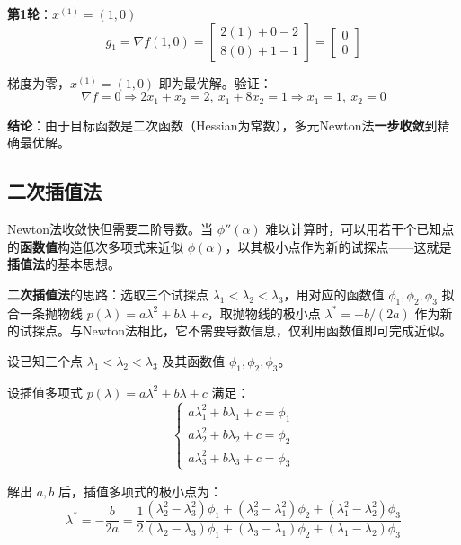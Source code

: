 \begin{example}[多元Newton法]
\textbf{第1轮}：$x^{(1)} = (1, 0)$
\[
g_1 = \nabla f(1, 0) = \begin{bmatrix} 2(1) + 0 - 2 \\ 8(0) + 1 - 1 \end{bmatrix} = \begin{bmatrix} 0 \\ 0 \end{bmatrix}
\]

梯度为零，$x^{(1)} = (1, 0)$ 即为最优解。验证：
\[
\nabla f = 0 \Rightarrow 2x_1 + x_2 = 2,\ x_1 + 8x_2 = 1 \Rightarrow x_1 = 1,\ x_2 = 0
\]

\textbf{结论}：由于目标函数是二次函数（Hessian为常数），多元Newton法\textbf{一步收敛}到精确最优解。
\end{example}

\subsection{二次插值法}

Newton法收敛快但需要二阶导数。当 $\phi''(\alpha)$ 难以计算时，可以用若干个已知点的\textbf{函数值}构造低次多项式来近似 $\phi(\alpha)$，以其极小点作为新的试探点——这就是\textbf{插值法}的基本思想。

\textbf{二次插值法}的思路：选取三个试探点 $\lambda_1 < \lambda_2 < \lambda_3$，用对应的函数值 $\phi_1, \phi_2, \phi_3$ 拟合一条抛物线 $p(\lambda) = a\lambda^2 + b\lambda + c$，取抛物线的极小点 $\lambda^* = -b/(2a)$ 作为新的试探点。与Newton法相比，它不需要导数信息，仅利用函数值即可完成近似。

\begin{conceptbox}[二次插值法原理]
设已知三个点 $\lambda_1 < \lambda_2 < \lambda_3$ 及其函数值 $\phi_1, \phi_2, \phi_3$。

设插值多项式 $p(\lambda) = a\lambda^2 + b\lambda + c$ 满足：
\[
\begin{cases}
a\lambda_1^2 + b\lambda_1 + c = \phi_1 \\
a\lambda_2^2 + b\lambda_2 + c = \phi_2 \\
a\lambda_3^2 + b\lambda_3 + c = \phi_3
\end{cases}
\]

解出 $a, b$ 后，插值多项式的极小点为：
\[
\lambda^* = -\frac{b}{2a} = \frac{1}{2} \frac{(\lambda_2^2 - \lambda_3^2)\phi_1 + (\lambda_3^2 - \lambda_1^2)\phi_2 + (\lambda_1^2 - \lambda_2^2)\phi_3}{(\lambda_2 - \lambda_3)\phi_1 + (\lambda_3 - \lambda_1)\phi_2 + (\lambda_1 - \lambda_2)\phi_3}
\]
\end{conceptbox}

